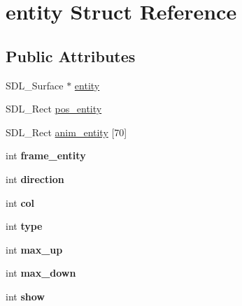 \hypertarget{structentity}{}\section{entity Struct Reference}
\label{structentity}
\subsection*{Public Attributes}
\begin{DoxyCompactItemize}
\item 
S\+D\+L\+\_\+\+Surface $\ast$ \hyperlink{structentity_a1d532bf2d860422dbcdbf5a3d53bec2a}{entity}
\item 
S\+D\+L\+\_\+\+Rect \hyperlink{structentity_afad5429807d112e50d95031d2a7317ca}{pos\+\_\+entity}
\item 
S\+D\+L\+\_\+\+Rect \hyperlink{structentity_a854a764985b0f1ae5969d3d31534dafc}{anim\+\_\+entity} \mbox{[}70\mbox{]}
\item 
int {\bfseries frame\+\_\+entity}\hypertarget{structentity_a60fd1d07d2b5e6c5e02d3a10d51cec8a}{}\label{structentity_a60fd1d07d2b5e6c5e02d3a10d51cec8a}

\item 
int {\bfseries direction}\hypertarget{structentity_a643c70cbdbf48c0e06d66c2d20ada874}{}\label{structentity_a643c70cbdbf48c0e06d66c2d20ada874}

\item 
int {\bfseries col}\hypertarget{structentity_a5e6a4bc4a8cbd87a5003ac338a832fa7}{}\label{structentity_a5e6a4bc4a8cbd87a5003ac338a832fa7}

\item 
int {\bfseries type}\hypertarget{structentity_afb415e14577c5fc356ae19ad90aa36f3}{}\label{structentity_afb415e14577c5fc356ae19ad90aa36f3}

\item 
int {\bfseries max\+\_\+up}\hypertarget{structentity_ad35af5a0d54177d169f799bd4cebf767}{}\label{structentity_ad35af5a0d54177d169f799bd4cebf767}

\item 
int {\bfseries max\+\_\+down}\hypertarget{structentity_a82abfb3de23d8fb9ddc6ce8354050113}{}\label{structentity_a82abfb3de23d8fb9ddc6ce8354050113}

\item 
int {\bfseries show}\hypertarget{structentity_a3eda708ba5febdc2d10698d31131fb5d}{}\label{structentity_a3eda708ba5febdc2d10698d31131fb5d}

\end{DoxyCompactItemize}


